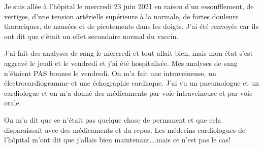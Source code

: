 Je suis allée à l'hôpital le mercredi 23 juin 2021 en raison d'un essoufflement,
de vertiges, d'une tension artérielle supérieure à la normale, de fortes
douleurs thoraciques, de nausées et de picotements dans les doigts. J'ai été
renvoyée car ils ont dit que c'était un effet secondaire normal du vaccin.

J'ai fait des analyses de sang le mercredi et tout allait bien, mais mon état
s'est aggravé le jeudi et le vendredi et j'ai été hospitalisée. Mes analyses de
sang n'étaient PAS bonnes le vendredi. On m'a fait une intraveineuse, un
électrocardiogramme et une échographie cardiaque. J'ai vu un pneumologue et un
cardiologue et on m'a donné des médicaments par voie intraveineuse et par voie
orale.

On m'a dit que ce n'était pas quelque chose de permanent et que cela
disparaissait avec des médicaments et du repos. Les médecins cardiologues de
l'hôpital m'ont dit que j'allais bien maintenant….mais ce n'est pas le cas!


